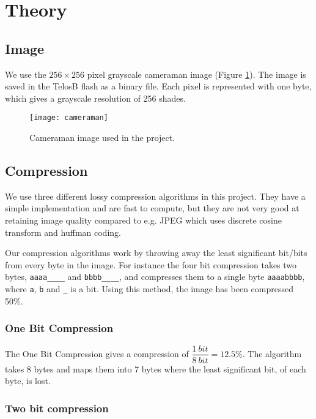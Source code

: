 \section{Theory}

\subsection{Image}
We use the $256 \times 256$ pixel grayscale cameraman image (Figure \ref{fig:image_cameraman}). The image is saved in the TelosB flash as a binary file. Each pixel is represented with one byte, which gives a grayscale resolution of 256 shades.

\begin{figure}[ht!]
\centering
\texttt{[image: cameraman]}
\caption{Cameraman image used in the project.}
\label{fig:image_cameraman}
\end{figure}

\subsection{Compression}

We use three different lossy compression algorithms in this project.
They have a simple implementation and are fast to compute, but they are not very good at retaining image quality compared to e.g. JPEG which uses discrete cosine transform and huffman coding.

Our compression algorithms work by throwing away the least significant bit/bits from every byte in the image.
For instance the four bit compression takes two bytes, \texttt{aaaa\_\_\_\_} and \texttt{bbbb\_\_\_\_}, and compresses them to a single byte \texttt{aaaabbbb}, where \texttt{a}, \texttt{b} and \texttt{\_} is a bit. Using this method, the image has been compressed 50\%.


\subsubsection{One Bit Compression} %
\label{sub:one_bit_compression}

The One Bit Compression gives a compression of $\dfrac{1\ bit}{8\ bit} = 12.5\%$.
The algorithm takes 8 bytes and maps them into 7 bytes where the least significant bit, of each byte, is lost.

\subsubsection{Two bit compression} %
\label{sub:two_bit_compression}

